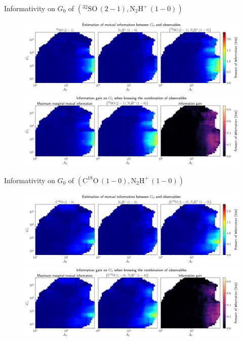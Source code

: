 \documentclass{beamer}
\begin{document}
\begin{frame}{Informativity on $G_0$ of $\left(\mathrm{^{32}SO\,(2-1)},\mathrm{N_2H^+\,(1-0)}\right)$}
    \begin{figure}
        \centering
        \includegraphics[width=0.95\linewidth]{../mi/g0__32so21_n2hp10_mi.png}
        \vfill
        \includegraphics[width=0.95\linewidth]{../mi/g0__32so21_n2hp10_mi_gain.png}
    \end{figure}
\end{frame}

\begin{frame}{Informativity on $G_0$ of $\left(\mathrm{C^{18}O\,(1-0)},\mathrm{N_2H^+\,(1-0)}\right)$}
    \begin{figure}
        \centering
        \includegraphics[width=0.95\linewidth]{../mi/g0__c18o10_n2hp10_mi.png}
        \vfill
        \includegraphics[width=0.95\linewidth]{../mi/g0__c18o10_n2hp10_mi_gain.png}
    \end{figure}
\end{frame}
\end{document}
